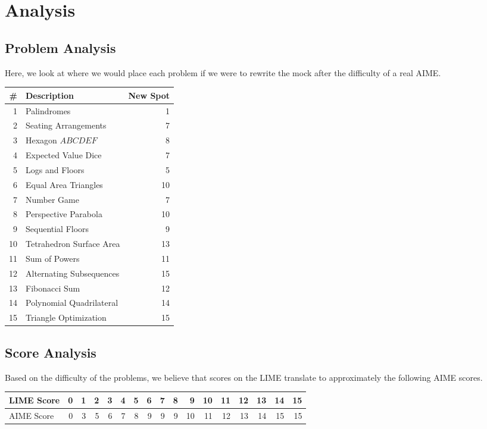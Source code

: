 \documentclass[11pt]{scrartcl}
\begin{document}
\pagebreak

\section{Analysis}

\subsection{Problem Analysis}

Here, we look at where we would place each problem if we were to rewrite the mock after the difficulty of a real AIME.

\begin{center}
    \begin{tabular}{r l | r}
        \# & Description & New Spot \\
        \hline
        1 & Palindromes & 1 \\
        2 & Seating Arrangements & 7 \\
        3 & Hexagon $ABCDEF$ & 8 \\
        4 & Expected Value Dice & 7 \\
        5 & Logs and Floors & 5 \\
        6 & Equal Area Triangles & 10 \\
        7 & Number Game & 7 \\
        8 & Perspective Parabola & 10 \\
        9 & Sequential Floors & 9 \\
        10 & Tetrahedron Surface Area & 13 \\
        11 & Sum of Powers & 11 \\
        12 & Alternating Subsequences & 15 \\
        13 & Fibonacci Sum & 12 \\
        14 & Polynomial Quadrilateral & 14 \\
        15 & Triangle Optimization & 15
    \end{tabular}
\end{center}

\subsection{Score Analysis}

Based on the difficulty of the problems, we believe that scores on the LIME translate to approximately the following AIME scores.

\begin{center}
    \begin{tabular}{l | r r r r r r r r r r r r r r r r}
        LIME Score & 0 & 1 & 2 & 3 & 4 & 5 & 6 & 7 & 8 & 9 & 10 & 11 & 12 & 13 & 14 & 15 \\
        \hline
        AIME Score & 0 & 3 & 5 & 6 & 7 & 8 & 9 & 9 & 9 & 10 & 11 & 12 & 13 & 14 & 15 & 15
    \end{tabular}
\end{center}
\end{document}
